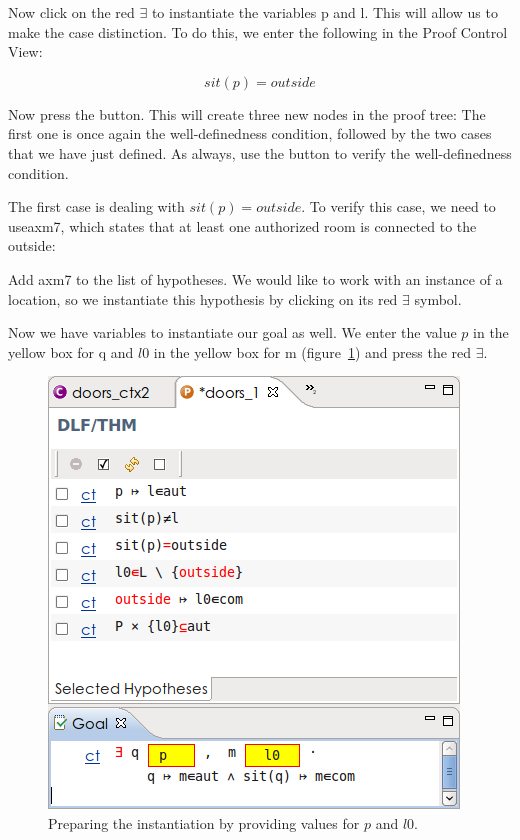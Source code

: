 Now click on the red $\exists$ to instantiate the variables p and l. This will allow us to make the case distinction. To do this, we enter the following in the Proof Control View:

$$ sit(p) = outside $$

Now press the  button.  This will create three new nodes in the proof tree: The first one is once again the well-definedness condition, followed by the two cases that we have just defined.  As always, use the  button to verify the well-definedness condition.

The first case is dealing with $sit(p) = outside$.  To verify this case, we need to use\textsf{axm7}, which states that at least one authorized room is connected to the outside:


Add \textsf{axm7} to the list of hypotheses.  We would like to work with an instance of a location, so we instantiate this hypothesis by clicking on its red $\exists$ symbol.


Now we have variables to instantiate our goal as well.  We enter the value $p$ in the yellow box for q and $l0$ in the yellow box for m (figure~\ref{tut_10_ref_proof2}) and press the red  $\exists$.

\begin{figure}[!ht]
\begin{center}
	\includegraphics[]{img/tutorial/tut_10_ref_proof2.png}
	\caption{Preparing the instantiation by providing values for $p$ and $l0$.}
	\label{tut_10_ref_proof2}
\end{center}
\end{figure}

